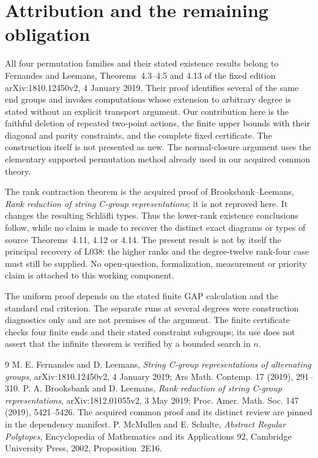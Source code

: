 \documentclass[11pt]{article}
\begin{document}
\section{Attribution and the remaining obligation}
All four permutation families and their stated existence results belong to
Fernandes and
Leemans, Theorems~4.3--4.5 and 4.13 of the fixed edition arXiv:1810.12450v2,
4 January 2019. Their proof identifies several of the same end groups
and invokes computations whose extension to arbitrary degree is stated
without an explicit transport argument. Our contribution here is the
faithful deletion of repeated two-point actions, the finite upper bounds
with their diagonal and parity constraints, and the complete fixed
certificate. The construction itself is not presented as new. The
normal-closure argument uses the elementary supported permutation
method already used in our acquired common theory.

The rank contraction theorem is the acquired proof of
Brooksbank--Leemans, \emph{Rank reduction of string C-group
representations}; it is not reproved here. It changes the resulting
Schl\"afli types. Thus the lower-rank existence conclusions follow, while
no claim is made to recover the distinct exact diagrams or types of
source Theorems~4.11, 4.12 or 4.14. The present result is not by itself
the principal recovery of L038: the higher ranks and the degree-twelve rank-four case must still be supplied. No open-question, formalization,
measurement or priority claim is attached to this working component.

The uniform proof depends on the stated finite GAP calculation and the
standard end criterion. The separate runs at several degrees were
construction diagnostics only and are not premises of the argument.
The finite certificate checks four finite ends and their stated constraint subgroups;
its use does not assert that the infinite theorem is verified by a
bounded search in $n$.
\begin{thebibliography}{9}
 M. E. Fernandes and D. Leemans,
\emph{String C-group representations of alternating groups},
arXiv:1810.12450v2, 4 January 2019; Ars Math. Contemp. 17 (2019), 291--310.
 P. A. Brooksbank and D. Leemans,
\emph{Rank reduction of string C-group representations},
arXiv:1812.01055v2, 3 May 2019; Proc. Amer. Math. Soc. 147 (2019),
5421--5426. The acquired common proof and its distinct review are pinned
in the dependency manifest.
 P. McMullen and E. Schulte, \emph{Abstract Regular Polytopes},
Encyclopedia of Mathematics and its Applications 92, Cambridge University
Press, 2002, Proposition~2E16.
\end{thebibliography}
\end{document}
